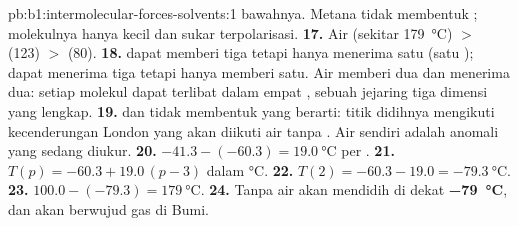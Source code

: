 \begin{solution}{pb:b1:intermolecular-forces-solvents:1}
bawahnya. Metana tidak membentuk ; molekulnya hanya kecil
dan sukar terpolarisasi.
\textbf{17.} Air (sekitar \qty{179}{\celsius}) $>$  (123) $>$
 (80).
\textbf{18.}  dapat memberi tiga tetapi hanya menerima satu (satu
);  dapat menerima tiga tetapi hanya memberi satu.
Air memberi dua dan menerima dua: setiap molekul dapat terlibat dalam
empat , sebuah jejaring tiga dimensi yang lengkap.
\textbf{19.}  dan  tidak membentuk  yang
berarti: titik didihnya mengikuti kecenderungan London yang akan diikuti
air tanpa . Air sendiri adalah anomali yang sedang diukur.
\textbf{20.} $-41.3 - (-60.3) = \qty{19.0}{\celsius}$ per .
\textbf{21.} $T(p) = -60.3 + 19.0\,(p - 3)$ dalam \unit{\celsius}.
\textbf{22.} $T(2) = -60.3 - 19.0 = \qty{-79.3}{\celsius}$.
\textbf{23.} $100.0 - (-79.3) = \qty{179}{\celsius}$.
\textbf{24.} Tanpa  air akan mendidih di dekat
\textbf{\qty{-79}{\celsius}}, dan akan berwujud gas di Bumi.
\end{solution}
